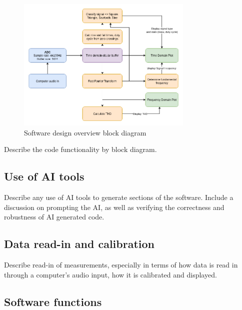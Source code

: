 \documentclass[11pt,a4paper]{article}
\begin{document}
\begin{figure}[H]
	\begin{center}
		\includegraphics[width=0.75\textwidth]{figures/software/software-design-overview-block-diagram.png}
		\caption{Software design overview block diagram}
		\label{fig:Software design overview block diagram}
	\end{center}
\end{figure}


Describe the code functionality by block diagram.

\subsection{Use of AI tools}

Describe any use of AI tools to generate sections of the software. Include a discussion on prompting the AI, as well as verifying the correctness and robustness of AI generated code.

\subsection{Data read-in and calibration}

Describe read-in of measurements, especially in terms of how data is read in through a computer’s audio input, how it is calibrated and displayed.

\subsection{Software functions}
\end{document}
